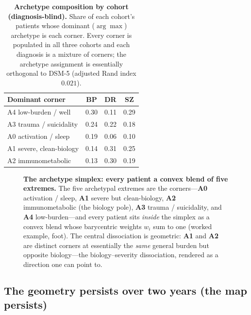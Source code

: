 \begin{table}[t]
\centering
\caption{\textbf{Archetype composition by cohort (diagnosis-blind).} Share of each cohort's
patients whose dominant ($\arg\max$) archetype is each corner. Every corner is populated in all
three cohorts and each diagnosis is a mixture of corners; the archetype assignment is essentially
orthogonal to DSM-5 (adjusted Rand index $0.021$).}
\label{tab:archcomp}
\small
\renewcommand{\arraystretch}{1.15}
\begin{tabular}{@{}l ccc@{}}
\toprule
Dominant corner & BP & DR & SZ \\
\midrule
A4 low-burden / well     & 0.30 & 0.11 & 0.29 \\
A3 trauma / suicidality  & 0.24 & 0.22 & 0.18 \\
A0 activation / sleep    & 0.19 & 0.06 & 0.10 \\
A1 severe, clean-biology & 0.14 & 0.31 & 0.25 \\
A2 immunometabolic       & 0.13 & 0.30 & 0.19 \\
\bottomrule
\end{tabular}
\end{table}

\begin{figure}[t]
  \centering
  \archetypesimplexblend
  \caption{\textbf{The archetype simplex: every patient a convex blend of five extremes.}
  The five archetypal extremes are the corners---\textbf{A0} activation / sleep,
  \textbf{A1} severe but clean-biology, \textbf{A2} immunometabolic (the biology pole),
  \textbf{A3} trauma / suicidality, and \textbf{A4} low-burden---and every patient sits
  \emph{inside} the simplex as a convex blend whose barycentric weights $w_i$ sum to one
  (worked example, foot). The central dissociation is geometric: \textbf{A1} and
  \textbf{A2} are distinct corners at essentially the \emph{same} general burden but
  opposite biology---the biology--severity dissociation, rendered as a direction one can point to.}
  \label{fig:archetypes}
\end{figure}

\subsection{The geometry persists over two years (the map persists)}

